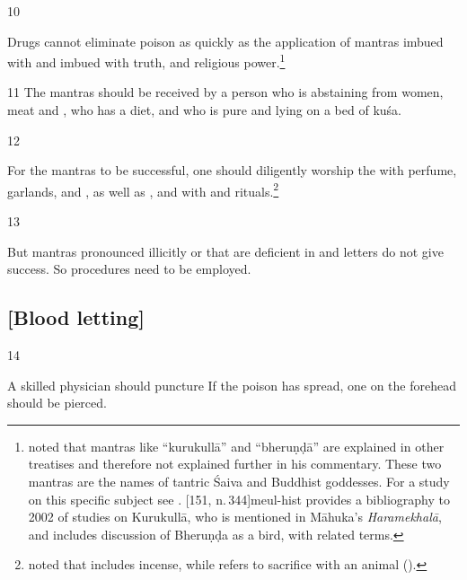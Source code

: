 \begin{translation}
\item [10]

Drugs cannot eliminate poison as quickly as the application of mantras
imbued with  and imbued with truth,
 and religious power.\footnote{
    noted that mantras like “kurukullā” and “bheruṇḍā” are explained in other
    treatises and therefore not explained further in his commentary. These
    two mantras are the names of tantric Śaiva and Buddhist goddesses. For a
    study on this specific subject see \citet{slou-2016b}. [151,
    n.\,344]{meul-hist} provides a bibliography to 2002 of studies on
    Kurukullā, who is mentioned in Māhuka's \emph{Haramekhalā}, and
    \cite[30--34]{meul-2008b} includes discussion of Bheruṇḍa as a bird, with
    related terms.} 

\item [11] The mantras should be received by a person who is
abstaining from women, meat and , who has a
 diet, and who is pure and lying on a bed of \gls{kuśa}.

\item [12]

For the mantras to be successful, one should diligently worship the
 with perfume, garlands, and ,
as well as , and with  and rituals.\footnote{ noted that
     includes incense, while  refers to sacrifice
    with an animal ().}


\item [13]

But mantras pronounced illicitly or that are deficient in
 and letters do not give success.  So
 procedures need to be employed.

\subsection{[Blood letting]}

\item [14]

A skilled physician should puncture  If the poison has spread, one on the forehead should be
pierced.


\end{translation}
